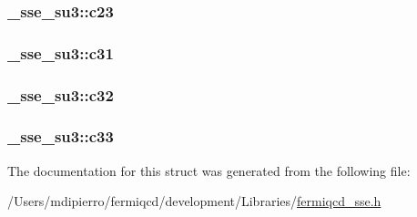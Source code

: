 \hypertarget{struct__sse__su3_a46ef8494dbb33bf1476b23a1d6e664f4}{
\subsubsection[{c23}]{ {\bf \_\-sse\_\-su3::c23}}}
\label{struct__sse__su3_a46ef8494dbb33bf1476b23a1d6e664f4}
\hypertarget{struct__sse__su3_ab826e31a499129f70ffa3c13df54445d}{
\subsubsection[{c31}]{ {\bf \_\-sse\_\-su3::c31}}}
\label{struct__sse__su3_ab826e31a499129f70ffa3c13df54445d}
\hypertarget{struct__sse__su3_a1ca57b8c0a62903f88d2e932aca89427}{
\subsubsection[{c32}]{ {\bf \_\-sse\_\-su3::c32}}}
\label{struct__sse__su3_a1ca57b8c0a62903f88d2e932aca89427}
\hypertarget{struct__sse__su3_ae85e43ae178100b4053d1c811c2d66ee}{
\subsubsection[{c33}]{ {\bf \_\-sse\_\-su3::c33}}}
\label{struct__sse__su3_ae85e43ae178100b4053d1c811c2d66ee}


The documentation for this struct was generated from the following file:\begin{DoxyCompactItemize}
\item 
/Users/mdipierro/fermiqcd/development/Libraries/\hyperlink{fermiqcd__sse_8h}{fermiqcd\_\-sse.h}\end{DoxyCompactItemize}
